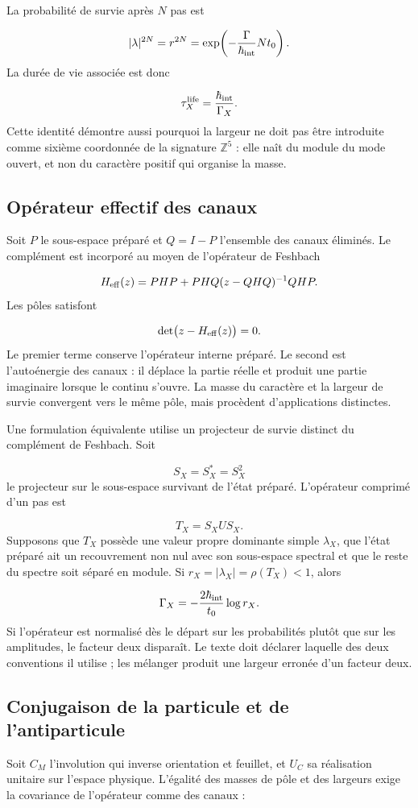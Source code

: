 La probabilité de survie après \(N\) pas est

\[
|\lambda|^{2N}=r^{2N}
=\exp\!\left(-\frac{\Gamma}{\hbar_{\rm int}}Nt_0\right).
\]
La durée de vie associée est donc

\[
\tau_X^{\rm life}=\frac{\hbar_{\rm int}}{\Gamma_X}.
\]
Cette identité démontre aussi pourquoi la largeur ne doit pas être introduite comme sixième coordonnée de la signature \(\mathbb Z^5\) : elle naît du module du mode ouvert, et non du caractère positif qui organise la masse.

\subsection{Opérateur effectif des canaux}
Soit \(P\) le sous-espace préparé et \(Q=I-P\) l'ensemble des canaux éliminés. Le complément est incorporé au moyen de l'opérateur de Feshbach

\[
H_{\rm eff}(z)
=PHP+PHQ(z-QHQ)^{-1}QHP.
\]
Les pôles satisfont

\[
\det\bigl(z-H_{\rm eff}(z)\bigr)=0.
\]
Le premier terme conserve l'opérateur interne préparé. Le second est l'autoénergie des canaux : il déplace la partie réelle et produit une partie imaginaire lorsque le continu s'ouvre. La masse du caractère et la largeur de survie convergent vers le même pôle, mais procèdent d'applications distinctes.

Une formulation équivalente utilise un projecteur de survie distinct du complément de Feshbach. Soit

\[
S_X=S_X^*=S_X^2
\]
le projecteur sur le sous-espace survivant de l'état préparé. L'opérateur comprimé d'un pas est

\[
T_X=S_XUS_X.
\]
Supposons que \(T_X\) possède une valeur propre dominante simple \(\lambda_X\), que l'état préparé ait un recouvrement non nul avec son sous-espace spectral et que le reste du spectre soit séparé en module. Si \(r_X=|\lambda_X|=\rho(T_X)<1\), alors

\[
\Gamma_X=-\frac{2\hbar_{\rm int}}{t_0}\log r_X.
\]
Si l'opérateur est normalisé dès le départ sur les probabilités plutôt que sur les amplitudes, le facteur deux disparaît. Le texte doit déclarer laquelle des deux conventions il utilise ; les mélanger produit une largeur erronée d'un facteur deux.

\subsection{Conjugaison de la particule et de l'antiparticule}
Soit \(C_M\) l'involution qui inverse orientation et feuillet, et \(U_C\) sa réalisation unitaire sur l'espace physique. L'égalité des masses de pôle et des largeurs exige la covariance de l'opérateur comme des canaux :

